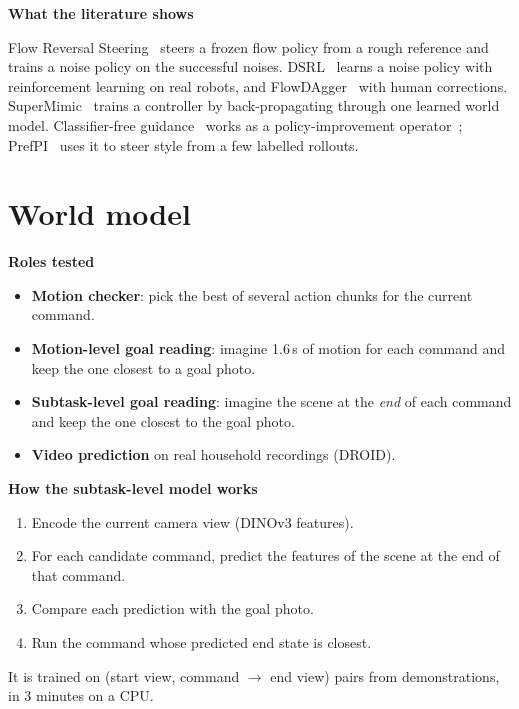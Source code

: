 \documentclass[11pt,a4paper]{article}
\newcommand{\sub}[1]{\par\needspace{4\baselineskip}\smallskip\noindent\textbf{#1}\par}
\begin{document}
\sub{What the literature shows}
Flow Reversal Steering~\cite{frs} steers a frozen flow policy from a rough reference and trains a noise policy on the successful noises. DSRL~\cite{dsrl} learns a noise policy with reinforcement learning on real robots, and FlowDAgger~\cite{flowdagger} with human corrections. SuperMimic~\cite{supermimic} trains a controller by back-propagating through one learned world model. Classifier-free guidance~\cite{cfg} works as a policy-improvement operator~\cite{cfgrl}; PrefPI~\cite{prefpi} uses it to steer style from a few labelled rollouts.

\section{World model}
\label{sec:wm}
\sub{Roles tested}
\begin{itemize}
\item \textbf{Motion checker}: pick the best of several action chunks for the current command.
\item \textbf{Motion-level goal reading}: imagine 1.6\,s of motion for each command and keep the one closest to a goal photo.
\item \textbf{Subtask-level goal reading}: imagine the scene at the \emph{end} of each command and keep the one closest to the goal photo.
\item \textbf{Video prediction} on real household recordings (DROID).
\end{itemize}

\sub{How the subtask-level model works}
\begin{enumerate}
\item Encode the current camera view (DINOv3 features).
\item For each candidate command, predict the features of the scene at the end of that command.
\item Compare each prediction with the goal photo.
\item Run the command whose predicted end state is closest.
\end{enumerate}
It is trained on (start view, command $\rightarrow$ end view) pairs from demonstrations, in 3 minutes on a CPU.
\end{document}
